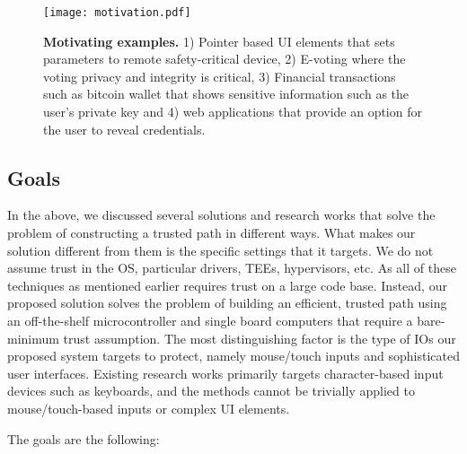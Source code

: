 \begin{figure}[t]
\centering
\texttt{[image: motivation.pdf]}
\caption{\textbf{Motivating examples.} 1) Pointer based UI elements that sets parameters to remote safety-critical device, 2) E-voting where the voting privacy and integrity is critical, 3) Financial transactions such as bitcoin wallet that shows sensitive information such as the user's private key and 4) web applications that provide an option for the user to reveal credentials.}
\label{fig:motivation}
\centering
\end{figure}

\subsection{Goals}

In the above, we discussed several solutions and research works that solve the problem of constructing a trusted path in different ways. What makes our solution different from them is the specific settings that it targets. We do not assume trust in the OS, particular drivers, TEEs, hypervisors, etc. As all of these techniques as mentioned earlier requires trust on a large code base. Instead, our proposed solution solves the problem of building an efficient, trusted path using an off-the-shelf microcontroller and single board computers that require a bare-minimum trust assumption. The most distinguishing factor is the type of IOs our proposed system targets to protect, namely mouse/touch inputs and sophisticated user interfaces. Existing research works primarily targets character-based input devices such as keyboards, and the methods cannot be trivially applied to mouse/touch-based inputs or complex UI elements. 

The goals are the following:

